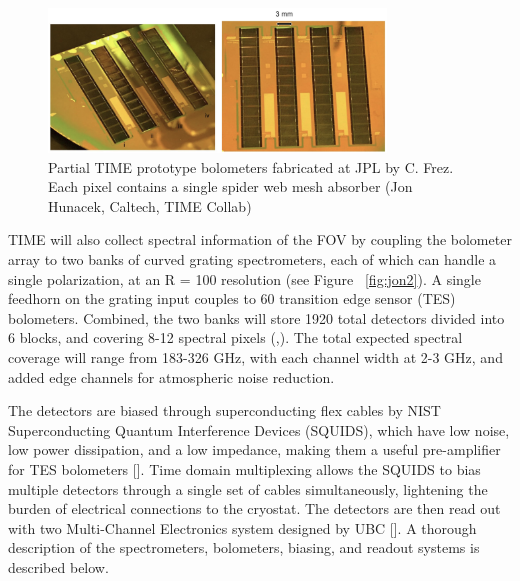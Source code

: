 \documentclass[manuscript]{aastex}
\begin{document}
\begin{figure}[H]
\centering
\captionsetup{width=0.8\textwidth}
\includegraphics[width=0.8\textwidth]{focalplane.png}
\caption[TIME Prototype bolometers -(Jon Hunacek, Caltech, TIME Collab)]{Partial TIME prototype bolometers fabricated at JPL by C. Frez. Each pixel contains a single spider web mesh absorber (Jon Hunacek, Caltech, TIME Collab)}
\label{fig:time1}
\end{figure}

TIME will also collect spectral information of the FOV by coupling the bolometer array to two banks of curved grating spectrometers, each of which can handle a single polarization, at an R = 100 resolution (see Figure ~\ref{fig:jon2}). A single feedhorn on the grating input couples to 60 transition edge sensor (TES) bolometers. Combined, the two banks will store 1920 total detectors divided into 6 blocks, and covering 8-12 spectral pixels  (\cite{Crites2014},\cite{Hunacek2016}). The total expected spectral coverage will range from 183-326 GHz, with each channel width at 2-3 GHz, and added edge channels for atmospheric noise reduction. 

The detectors are biased through superconducting flex cables by NIST Superconducting Quantum Interference Devices (SQUIDS), which have low noise, low power dissipation, and a low impedance, making them a useful pre-amplifier for TES bolometers [\cite{Dobbs2009}]. Time domain multiplexing allows the SQUIDS to bias multiple detectors through a single set of cables simultaneously, lightening the burden of electrical connections to the cryostat.  The detectors are then read out with two Multi-Channel Electronics system designed by UBC [\cite{Battistelli2008}]. A thorough description of the spectrometers, bolometers, biasing, and readout systems is described below. 
\end{document}
